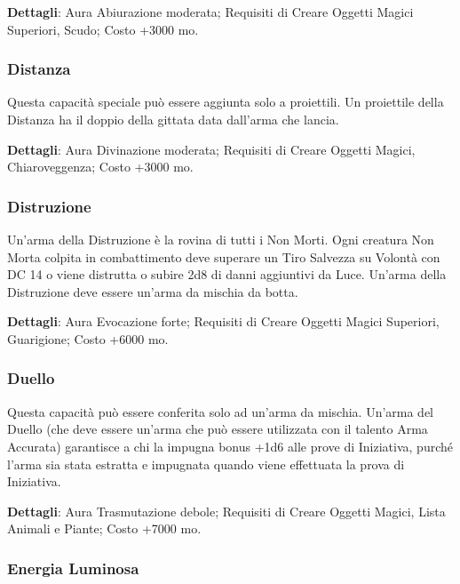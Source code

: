 \begin{multicols}{2}
	\textbf{Dettagli}: Aura Abiurazione moderata; Requisiti di Creare Oggetti Magici Superiori, Scudo; Costo +3000 mo.

	\subsubsection*{Distanza}

	Questa capacità speciale può essere aggiunta solo a proiettili. Un proiettile della Distanza ha il doppio della gittata data dall'arma che lancia.

	\textbf{Dettagli}: Aura Divinazione moderata; Requisiti di Creare Oggetti Magici, Chiaroveggenza; Costo +3000 mo.

	\subsubsection*{Distruzione}

	Un'arma della Distruzione è la rovina di tutti i Non Morti. Ogni creatura Non Morta colpita in combattimento deve superare un Tiro Salvezza su Volontà con DC 14 o viene distrutta o subire 2d8 di danni aggiuntivi da Luce. Un'arma della Distruzione deve essere un'arma da mischia da botta.

	\textbf{Dettagli}: Aura Evocazione forte; Requisiti di Creare Oggetti Magici Superiori, Guarigione; Costo +6000 mo.

	\subsubsection*{Duello}

	Questa capacità può essere conferita solo ad un'arma da mischia. Un'arma del Duello (che deve essere un'arma che può essere utilizzata con il talento Arma Accurata) garantisce a chi la impugna bonus +1d6 alle prove di Iniziativa, purché l'arma sia stata estratta e impugnata quando viene effettuata la prova di Iniziativa.

	\textbf{Dettagli}: Aura Trasmutazione debole; Requisiti di Creare Oggetti Magici, Lista Animali e Piante; Costo +7000 mo.

	\subsubsection*{Energia Luminosa}


\end{multicols}
